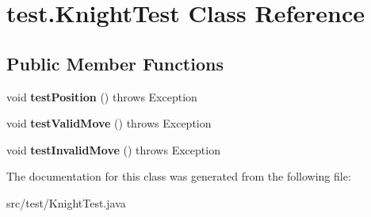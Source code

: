 \hypertarget{classtest_1_1_knight_test}{}\section{test.\+Knight\+Test Class Reference}
\label{classtest_1_1_knight_test}
\subsection*{Public Member Functions}
\begin{DoxyCompactItemize}
\item 
\mbox{\label{classtest_1_1_knight_test_a29bd8fee71c95dd45953f31ac6a8fef5}} 
void {\bfseries test\+Position} ()  throws Exception 
\item 
\mbox{\label{classtest_1_1_knight_test_aeaa3eef48cceb07d146943e346e6f170}} 
void {\bfseries test\+Valid\+Move} ()  throws Exception 
\item 
\mbox{\label{classtest_1_1_knight_test_a4feaa624058603101178188b8bcf223e}} 
void {\bfseries test\+Invalid\+Move} ()  throws Exception 
\end{DoxyCompactItemize}


The documentation for this class was generated from the following file\+:\begin{DoxyCompactItemize}
\item 
src/test/Knight\+Test.\+java\end{DoxyCompactItemize}
